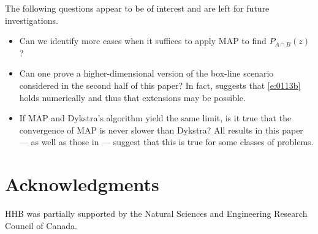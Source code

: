 \documentclass[12pt]{article}
\begin{document}
The following questions appear to be of interest and 
are left for future investigations. 
\begin{itemize}
  \item Can we identify more cases when it suffices to apply
   MAP to find $P_{A\cap B}(z)$?
  \item 
  Can one prove a higher-dimensional version of 
  the box-line scenario considered in the second half of this paper? 
  In fact, \cite{BBK} suggests that 
  \eqref{e:0113b} holds numerically and thus 
  that extensions may be possible. 
  \item If MAP and Dykstra's algorithm yield the same limit, is it true
  that the convergence of MAP is never slower than Dykstra?
  All results in this paper --- as well as those in \cite{Jat} --- suggest 
  that this is true for some classes of problems.
\end{itemize}



\section*{Acknowledgments}
HHB was partially supported by the Natural Sciences and
Engineering Research Council of Canada.
\end{document}
